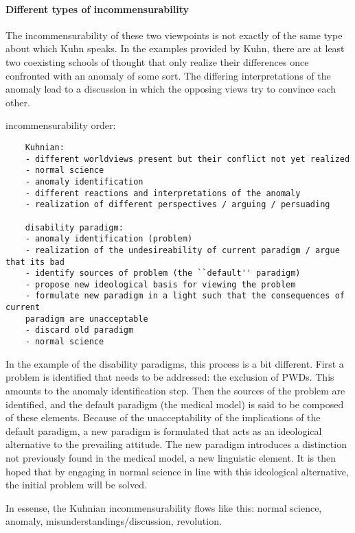 \documentclass[a4paper]{article}
\begin{document}
\paragraph{Different types of incommensurability}

The incommensurability of these two viewpoints is not exactly of the same type
about which Kuhn speaks. In the examples provided by Kuhn, there are at least
two coexisting schools of thought that only realize their differences once
confronted with an anomaly of some sort. The differing interpretations of the
anomaly lead to a discussion in which the opposing views try to convince each
other.

incommensurability order:

\begin{verbatim}
    Kuhnian: 
    - different worldviews present but their conflict not yet realized
    - normal science
    - anomaly identification
    - different reactions and interpretations of the anomaly
    - realization of different perspectives / arguing / persuading

    disability paradigm: 
    - anomaly identification (problem)
    - realization of the undesireability of current paradigm / argue that its bad
    - identify sources of problem (the ``default'' paradigm)
    - propose new ideological basis for viewing the problem
    - formulate new paradigm in a light such that the consequences of current
    paradigm are unacceptable
    - discard old paradigm
    - normal science
\end{verbatim}


In the example of the disability paradigms, this process is a bit different.
First a problem is identified that needs to be addressed: the exclusion of
PWDs. This amounts to the anomaly identification step. Then the sources of the
problem are identified, and the default paradigm (the medical model) is said
to be composed of these elements. Because of the unacceptability of the
implications of the default paradigm, a new paradigm is formulated that acts
as an ideological alternative to the prevailing attitude. The new paradigm
introduces a distinction not previously found in the medical model, a new
linguistic element. It is then hoped that by engaging in normal science in
line with this ideological alternative, the initial problem will be solved.

In essense, the Kuhnian incommensurability flows like this: normal science,
anomaly, misunderstandings/discussion, revolution.
\end{document}

